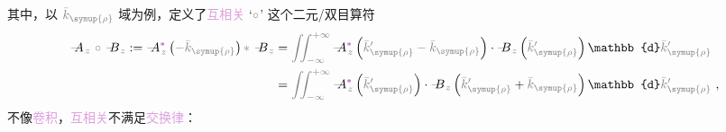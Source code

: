 其中，以 $\mathcolor{gray}{\bar{k}_{\symup{\rho}}}$ 域为例，定义了\textcolor{Plum}{互相关} `$\textcolor{gray}{\circ}$' 这个二元/双目算符
\begin{subequations} \label{eq:AcircB}
\begin{align}
	\xint{\mathcolor{gray}{-}}{18}{A}_{\;\! \mathcolor{gray}{z}} ~\textcolor{gray}{\circ}~ \xint{\mathcolor{gray}{-}}{18}{B}_{\;\! \mathcolor{gray}{z}} := \xint{\mathcolor{gray}{-}}{18}{A}_{\;\! \mathcolor{gray}{z}}^{\textcolor{Plum}{*}} \left( \mathcolor{gray}{- \bar{k}_{\symup{\rho}}} \right) \textcolor{gray}{*}~ \xint{\mathcolor{gray}{-}}{18}{B}_{\;\! \mathcolor{gray}{z}} &= \mathcolor{gray}{\iint_{-\infty}^{+\infty}} \xint{\mathcolor{gray}{-}}{18}{A}_{\;\! \mathcolor{gray}{z}}^{\textcolor{Plum}{*}} \left( \mathcolor{gray}{\bar{k}'_{\symup{\rho}}} \mathcolor{gray}{- \bar{k}_{\symup{\rho}}} \right) \cdot \xint{\mathcolor{gray}{-}}{18}{B}_{\;\! \mathcolor{gray}{z}} \left( \mathcolor{gray}{\bar{k}'_{\symup{\rho}}} \right) \mathbb{d} \mathcolor{gray}{\bar{k}'_{\symup{\rho}}} \label{eq:AcircB-a} \\ &= \mathcolor{gray}{\iint_{-\infty}^{+\infty}} \xint{\mathcolor{gray}{-}}{18}{A}_{\;\! \mathcolor{gray}{z}}^{\textcolor{Plum}{*}} \left( \mathcolor{gray}{\bar{k}'_{\symup{\rho}}} \right) \cdot \xint{\mathcolor{gray}{-}}{18}{B}_{\;\! \mathcolor{gray}{z}} \left( \mathcolor{gray}{\bar{k}'_{\symup{\rho}}} + \mathcolor{gray}{\bar{k}_{\symup{\rho}}} \right) \mathbb{d} \mathcolor{gray}{\bar{k}'_{\symup{\rho}}} \label{eq:AcircB-b}~, 
\end{align}
\end{subequations}
不像\textcolor{Plum}{卷积}，\textcolor{Plum}{互相关}不满足\textcolor{Plum}{交换律}：
